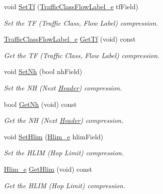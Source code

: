 \begin{DoxyCompactItemize}
void \hyperlink{classns3_1_1SixLowPanIphc_a5f2c75c1b36a9bc7cc0f884f407c5155}{Set\+Tf} (\hyperlink{classns3_1_1SixLowPanIphc_ac4bbe4168668e3b0656582cfa757b7dc}{Traffic\+Class\+Flow\+Label\+\_\+e} tf\+Field)
\begin{DoxyCompactList}\small\item\em Set the TF (Traffic Class, Flow Label) compression. \end{DoxyCompactList}\item 
\hyperlink{classns3_1_1SixLowPanIphc_ac4bbe4168668e3b0656582cfa757b7dc}{Traffic\+Class\+Flow\+Label\+\_\+e} \hyperlink{classns3_1_1SixLowPanIphc_af993076ebae73f4a9d96a2d14447d4e2}{Get\+Tf} (void) const 
\begin{DoxyCompactList}\small\item\em Get the TF (Traffic Class, Flow Label) compression. \end{DoxyCompactList}\item 
void \hyperlink{classns3_1_1SixLowPanIphc_a31ed5379a035e04a1feff5bae285a26d}{Set\+Nh} (bool nh\+Field)
\begin{DoxyCompactList}\small\item\em Set the NH (Next \hyperlink{classns3_1_1Header}{Header}) compression. \end{DoxyCompactList}\item 
bool \hyperlink{classns3_1_1SixLowPanIphc_ac9d2002e4493f2506eef09d89803aca9}{Get\+Nh} (void) const 
\begin{DoxyCompactList}\small\item\em Get the NH (Next \hyperlink{classns3_1_1Header}{Header}) compression. \end{DoxyCompactList}\item 
void \hyperlink{classns3_1_1SixLowPanIphc_a0d5a1956b408d48feea291f2d80bf71e}{Set\+Hlim} (\hyperlink{classns3_1_1SixLowPanIphc_a1fa5a18c5d53fd3583960b4ba01f093d}{Hlim\+\_\+e} hlim\+Field)
\begin{DoxyCompactList}\small\item\em Set the H\+L\+IM (Hop Limit) compression. \end{DoxyCompactList}\item 
\hyperlink{classns3_1_1SixLowPanIphc_a1fa5a18c5d53fd3583960b4ba01f093d}{Hlim\+\_\+e} \hyperlink{classns3_1_1SixLowPanIphc_a581cc55899f6886fa288caa4bd8fa533}{Get\+Hlim} (void) const 
\begin{DoxyCompactList}\small\item\em Get the H\+L\+IM (Hop Limit) compression. \end{DoxyCompactList}\item 

\end{DoxyCompactItemize}
